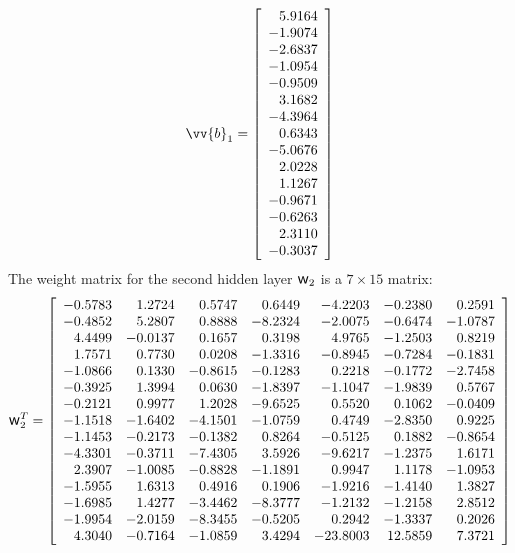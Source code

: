 \documentclass[twoside,english,1p,final,sort&compress]{elsarticle}
\theoremstyle{plain}
\newcommand{\w}{\mbox{\large\ensuremath{\mathsf{w}}}}
\renewcommand{\overrightarrow}{\vv}
\begin{document}
\begin{equation*}
\overrightarrow{b}_1 = \left[
\begin{array}{r}
5.9164\\ 
-1.9074\\ 
-2.6837\\ 
-1.0954\\ 
-0.9509\\ 
3.1682\\ 
-4.3964\\ 
0.6343\\ 
-5.0676\\ 
2.0228\\ 
1.1267\\ 
-0.9671\\ 
-0.6263\\ 
2.3110\\ 
-0.3037\\ 
\end{array}\right]
\end{equation*}
The weight matrix for the second hidden layer $\w_2$ is a $7\times15$ matrix:
\begin{equation*}
\w_2^T = \left[
\begin{array}{rrrrrrr}
-0.5783 & 1.2724 & 0.5747 & 0.6449 & -4.2203 & -0.2380 & 0.2591\\ 
-0.4852 & 5.2807 & 0.8888 & -8.2324 & -2.0075 & -0.6474 & -1.0787\\ 
4.4499 & -0.0137 & 0.1657 & 0.3198 & 4.9765 & -1.2503 & 0.8219\\ 
1.7571 & 0.7730 & 0.0208 & -1.3316 & -0.8945 & -0.7284 & -0.1831\\ 
-1.0866 & 0.1330 & -0.8615 & -0.1283 & 0.2218 & -0.1772 & -2.7458\\ 
-0.3925 & 1.3994 & 0.0630 & -1.8397 & -1.1047 & -1.9839 & 0.5767\\ 
-0.2121 & 0.9977 & 1.2028 & -9.6525 & 0.5520 & 0.1062 & -0.0409\\ 
-1.1518 & -1.6402 & -4.1501 & -1.0759 & 0.4749 & -2.8350 & 0.9225\\ 
-1.1453 & -0.2173 & -0.1382 & 0.8264 & -0.5125 & 0.1882 & -0.8654\\ 
-4.3301 & -0.3711 & -7.4305 & 3.5926 & -9.6217 & -1.2375 & 1.6171\\ 
2.3907 & -1.0085 & -0.8828 & -1.1891 & 0.9947 & 1.1178 & -1.0953\\ 
-1.5955 & 1.6313 & 0.4916 & 0.1906 & -1.9216 & -1.4140 & 1.3827\\ 
-1.6985 & 1.4277 & -3.4462 & -8.3777 & -1.2132 & -1.2158 & 2.8512\\ 
-1.9954 & -2.0159 & -8.3455 & -0.5205 & 0.2942 & -1.3337 & 0.2026\\ 
4.3040 & -0.7164 & -1.0859 & 3.4294 & -23.8003 & 12.5859 & 7.3721\\ 
\end{array}\right]
\end{equation*}
\end{document}
